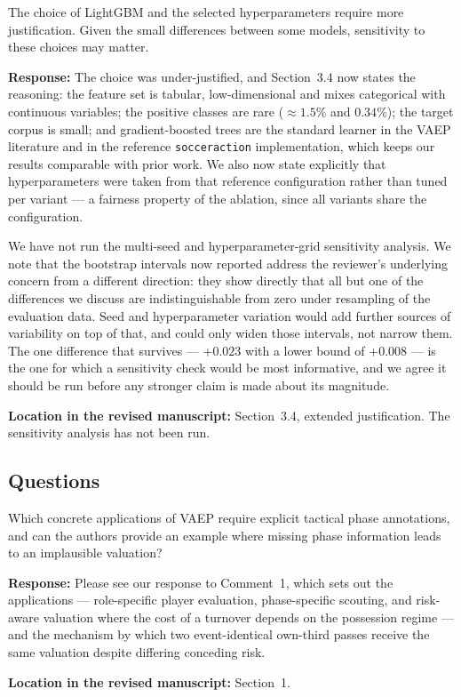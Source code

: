 \documentclass[11pt,a4paper]{article}
\newcommand{\response}[2]{%
  \begin{responsebox}
  \textbf{Response:}
  #1
  \end{responsebox}
  \begin{locationbox}
  \textbf{Location in the revised manuscript:}
  #2
  \end{locationbox}
}
\begin{document}
\begin{reviewbox}
The choice of LightGBM and the selected hyperparameters require more justification. Given the small differences between some models, sensitivity to these choices may matter.
\end{reviewbox}
\response{The choice was under-justified, and Section~3.4 now states the reasoning: the feature set is tabular, low-dimensional and mixes categorical with continuous variables; the positive classes are rare ($\approx 1.5\%$ and $0.34\%$); the target corpus is small; and gradient-boosted trees are the standard learner in the VAEP literature and in the reference \texttt{socceraction} implementation, which keeps our results comparable with prior work. We also now state explicitly that hyperparameters were taken from that reference configuration rather than tuned per variant --- a fairness property of the ablation, since all variants share the configuration.

We have not run the multi-seed and hyperparameter-grid sensitivity analysis. We note that the bootstrap intervals now reported address the reviewer's underlying concern from a different direction: they show directly that all but one of the differences we discuss are indistinguishable from zero under resampling of the evaluation data. Seed and hyperparameter variation would add further sources of variability on top of that, and could only widen those intervals, not narrow them. The one difference that survives --- $+0.023$ with a lower bound of $+0.008$ --- is the one for which a sensitivity check would be most informative, and we agree it should be run before any stronger claim is made about its magnitude.}{Section~3.4, extended justification. The sensitivity analysis has not been run.}

\subsection*{Questions}

\begin{reviewbox}[Question 1]
Which concrete applications of VAEP require explicit tactical phase annotations, and can the authors provide an example where missing phase information leads to an implausible valuation?
\end{reviewbox}
\response{Please see our response to Comment~1, which sets out the applications --- role-specific player evaluation, phase-specific scouting, and risk-aware valuation where the cost of a turnover depends on the possession regime --- and the mechanism by which two event-identical own-third passes receive the same valuation despite differing conceding risk.}{Section~1.}
\end{document}

